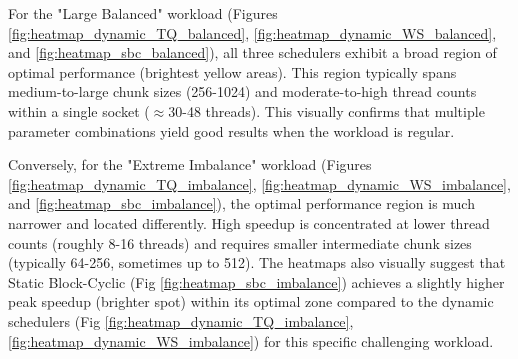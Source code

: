 \documentclass[10pt]{article}
\begin{document}
For the "Large Balanced" workload (Figures \ref{fig:heatmap_dynamic_TQ_balanced}, \ref{fig:heatmap_dynamic_WS_balanced}, and \ref{fig:heatmap_sbc_balanced}), all three schedulers exhibit a broad region of optimal performance (brightest yellow areas). This region typically spans medium-to-large chunk sizes (256-1024) and moderate-to-high thread counts within a single socket ($\approx$30-48 threads). This visually confirms that multiple parameter combinations yield good results when the workload is regular.

Conversely, for the "Extreme Imbalance" workload (Figures \ref{fig:heatmap_dynamic_TQ_imbalance}, \ref{fig:heatmap_dynamic_WS_imbalance}, and \ref{fig:heatmap_sbc_imbalance}), the optimal performance region is much narrower and located differently. High speedup is concentrated at lower thread counts (roughly 8-16 threads) and requires smaller intermediate chunk sizes (typically 64-256, sometimes up to 512). The heatmaps also visually suggest that Static Block-Cyclic (Fig \ref{fig:heatmap_sbc_imbalance}) achieves a slightly higher peak speedup (brighter spot) within its optimal zone compared to the dynamic schedulers (Fig \ref{fig:heatmap_dynamic_TQ_imbalance}, \ref{fig:heatmap_dynamic_WS_imbalance}) for this specific challenging workload.
\end{document}

